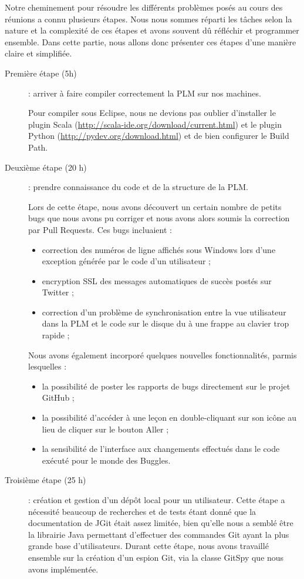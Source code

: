 Notre cheminement pour résoudre les différents problèmes posés au cours des réunions a connu plusieurs étapes. Nous nous sommes réparti les tâches selon la nature et la complexité de ces étapes et avons souvent dû réfléchir et programmer ensemble. Dans cette partie, nous allons donc présenter ces étapes d'une manière claire et simplifiée.

\begin{description}
\item[Première étape (5h)] : arriver à faire compiler correctement la PLM sur nos machines.

Pour compiler sous Eclipse, nous ne devions pas oublier d'installer le plugin Scala (\url{http://scala-ide.org/download/current.html}) et le plugin Python (\url{http://pydev.org/download.html}) et de bien configurer le Build Path.

\item[Deuxième étape (20 h)] : prendre connaissance du code et de la structure de la PLM.

Lors de cette étape, nous avons découvert un certain nombre de petits bugs que nous avons pu corriger et nous avons alors soumis la correction par Pull Requests. Ces bugs incluaient :

	\begin{itemize}
	\item correction des numéros de ligne affichés sous Windows lors d'une exception générée par le code d'un utilisateur ;
	\item encryption SSL des messages automatiques de succès postés sur Twitter ;
	\item correction d'un problème de synchronisation entre la vue utilisateur dans la PLM et le code sur le disque du à une frappe au clavier trop rapide ;
	\end{itemize}

Nous avons également incorporé quelques nouvelles fonctionnalités, parmis lesquelles :
	\begin{itemize}
	\item la possibilité de poster les rapports de bugs directement sur le projet GitHub ;
	\item la possibilité d'accéder à une leçon en double-cliquant sur son icône au lieu de cliquer sur le bouton \og Aller\fg{} ;
	\item la sensibilité de l'interface aux changements effectués dans le code exécuté pour le monde des Buggles.
	\end{itemize}
	
\item[Troisième étape (25 h)] : création et gestion d'un dépôt local pour un utilisateur.
Cette étape a nécessité beaucoup de recherches et de tests étant donné que la documentation de JGit était assez limitée, bien qu'elle nous a semblé être la librairie Java permettant d'effectuer des commandes Git ayant la plus grande base d'utilisateurs. Durant cette étape, nous avons travaillé ensemble sur la création d'un espion Git, via la classe GitSpy que nous avons implémentée.



\end{description}
